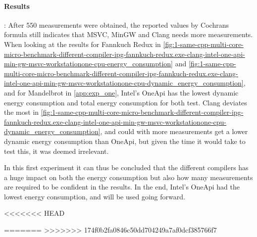 \paragraph{Results}: After 550 measurements were obtained, the reported values by Cochrans formula still indicates that MSVC, MinGW and Clang needs more measurements. When looking at the results for Fannkuch Redux in \cref{fig:1-same-cpp-multi-core-micro-benchmark-different-compiler-ipg-fannkuch-redux.exe-clang-intel-one-api-min-gw-msvc-workstationone-cpu-energy_consumption} and \cref{fig:1-same-cpp-multi-core-micro-benchmark-different-compiler-ipg-fannkuch-redux.exe-clang-intel-one-api-min-gw-msvc-workstationone-cpu-dynamic_energy_consumption}, and for Mandelbrot in \cref{app:exp_one}, Intel's OneApi has the lowest dynamic energy consumption and total energy consumption for both test. Clang deviates the most in \cref{fig:1-same-cpp-multi-core-micro-benchmark-different-compiler-ipg-fannkuch-redux.exe-clang-intel-one-api-min-gw-msvc-workstationone-cpu-dynamic_energy_consumption}, and could with more measurements get a lower dynamic energy consumption than OneApi, but given the time it would take to test this, it was deemed irrelevant.

In this first experiment it can thus be concluded that the different compilers has a huge impact on both the energy consumption but also how many measurements are required to be confident in the results. In the end, Intel's OneApi had the lowest energy consumption, and will be used going forward.

<<<<<<< HEAD

=======
%
>>>>>>> 174f0b2fa0846c50dd704249a7af0dcf385766f7
